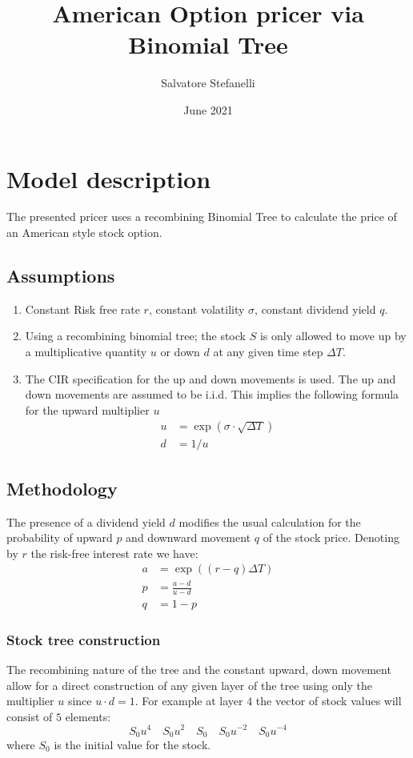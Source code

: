 \documentclass{article}
\title{American Option pricer via Binomial Tree}
\author{Salvatore Stefanelli}
\date{June 2021}
\begin{document}
\maketitle

\section{Model description}
The presented pricer uses a recombining Binomial Tree to calculate the price of an American style stock option.\\
\subsection{Assumptions}
\begin{enumerate}
    \item Constant Risk free rate $r$, constant volatility $\sigma$, constant dividend yield $q$.
    \item Using a recombining binomial tree; the stock $S$ is only allowed to move up by a multiplicative quantity $u$ or down $d$ at any given time step $\Delta T$.
    \item The CIR specification for the up and down movements is used. The up and down movements are assumed to be i.i.d. This implies the following formula for the upward multiplier $u$
    \begin{align*}
    u &= \exp\left(\sigma \cdot \sqrt{\Delta T}\right) \\
    d &= 1 / u
    \end{align*}
\end{enumerate}

\subsection{Methodology}
The presence of a dividend yield $d$ modifies the usual calculation for the probability of upward $p$ and downward movement $q$ of the stock price. Denoting by $r$ the risk-free interest rate we have:
\begin{align*}
    a &= \exp\left((r - q)\Delta T \right) \\
    p &= \frac{a - d}{u - d}  \\
    q &= 1 - p
\end{align*}
\subsubsection{Stock tree construction}
The recombining nature of the tree and the constant upward, down movement allow for a direct construction of any given layer of the tree using only the multiplier $u$ since $u\cdot d = 1$. For example at layer $4$ the vector of stock values will consist of $5$ elements:
\[
S_0u^4 \quad S_0u^2 \quad S_0 \quad S_0u^{-2} \quad S_0u^{-4} 
\]
where $S_0$ is the initial value for the stock.
\end{document}
